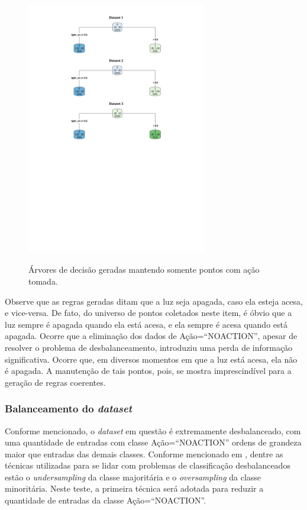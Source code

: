 \begin{figure}[hp]
	\centering
	\caption{Árvores de decisão geradas mantendo somente pontos com ação tomada.}
  \includegraphics[width=0.7\textwidth]{imagens/teste_learning/3.pdf}
  \label{fig:teste_3}  
\end{figure}

Observe que as regras geradas ditam que a luz seja apagada, caso ela esteja acesa, e vice-versa. De fato, do universo de pontos coletados neste item, é óbvio que a luz sempre é apagada quando ela está acesa, e ela sempre é acesa quando está apagada. Ocorre que a eliminação dos dados de Ação=``NO\underline{\space}ACTION'', apesar de resolver o problema de desbalanceamento, introduziu uma perda de informação significativa. Ocorre que, em diversos momentos em que a luz está acesa, ela não é apagada. A manutenção de tais pontos, pois, se mostra imprescindível para a geração de regras coerentes.

\subsubsection{Balanceamento do \textit{dataset}}
Conforme mencionado, o \textit{dataset} em questão é extremamente desbalanceado, com uma quantidade de entradas com classe Ação=``NO\underline{\space}ACTION'' ordens de grandeza maior que entradas das demais classes. Conforme mencionado em \cite{han2005}, dentre as técnicas utilizadas para se lidar com problemas de classificação desbalanceados estão o \textit{undersampling} da classe majoritária e o \textit{oversampling} da classe minoritária. Neste teste, a primeira técnica será adotada para reduzir a quantidade de entradas da classe Ação=``NO\underline{\space}ACTION''.

